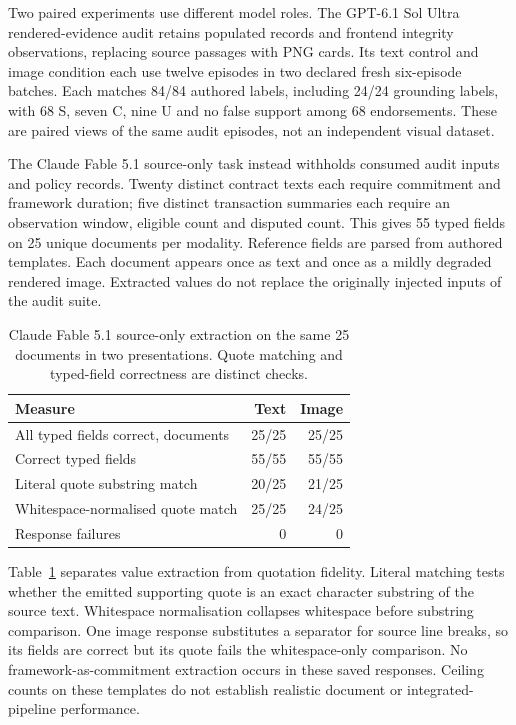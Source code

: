 Two paired experiments use different model roles. The GPT-6.1 Sol Ultra rendered-evidence audit retains populated records and frontend integrity observations, replacing source passages with PNG cards. Its text control and image condition each use twelve episodes in two declared fresh six-episode batches. Each matches 84/84 authored labels, including 24/24 grounding labels, with 68 S, seven C, nine U and no false support among 68 endorsements. These are paired views of the same audit episodes, not an independent visual dataset.

The Claude Fable 5.1 source-only task instead withholds consumed audit inputs and policy records. Twenty distinct contract texts each require commitment and framework duration; five distinct transaction summaries each require an observation window, eligible count and disputed count. This gives 55 typed fields on 25 unique documents per modality. Reference fields are parsed from authored templates. Each document appears once as text and once as a mildly degraded rendered image. Extracted values do not replace the originally injected inputs of the audit suite.

\begin{table}[t]
\caption{Claude Fable 5.1 source-only extraction on the same 25 documents in two presentations. Quote matching and typed-field correctness are distinct checks.}
\label{tab:supp-extraction}
\small
\begin{tabularx}{\columnwidth}{@{}Xrr@{}}
\toprule
Measure & Text & Image\\
\midrule
All typed fields correct, documents & 25/25 & 25/25\\
Correct typed fields & 55/55 & 55/55\\
Literal quote substring match & 20/25 & 21/25\\
Whitespace-normalised quote match & 25/25 & 24/25\\
Response failures & 0 & 0\\
\bottomrule
\end{tabularx}
\end{table}

Table~\ref{tab:supp-extraction} separates value extraction from quotation fidelity. Literal matching tests whether the emitted supporting quote is an exact character substring of the source text. Whitespace normalisation collapses whitespace before substring comparison. One image response substitutes a separator for source line breaks, so its fields are correct but its quote fails the whitespace-only comparison. No framework-as-commitment extraction occurs in these saved responses. Ceiling counts on these templates do not establish realistic document or integrated-pipeline performance.

